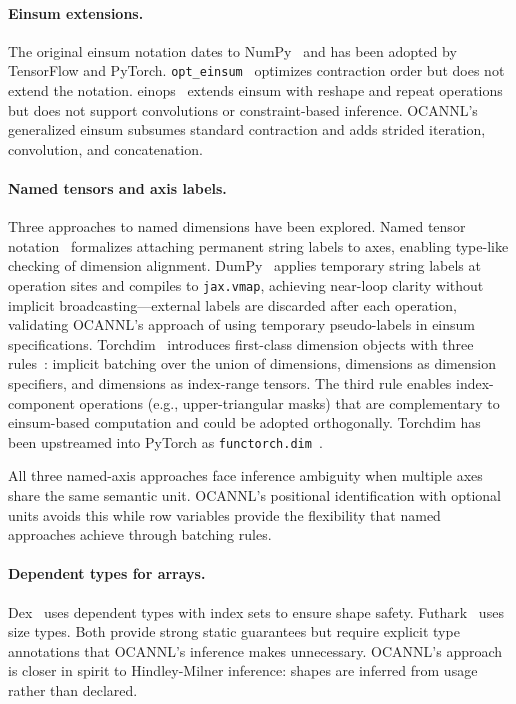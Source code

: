 \documentclass[acmsmall,nonacm,review]{acmart}
\begin{document}
\paragraph{Einsum extensions.}
The original einsum notation dates to NumPy~\cite{harris2020array} and has
been adopted by TensorFlow and PyTorch. \texttt{opt\_einsum}~\cite{smith2018opt}
optimizes contraction order but does not extend the notation.
einops~\cite{rogozhnikov2022einops} extends einsum with reshape and repeat
operations but does not support convolutions or constraint-based inference.
OCANNL's generalized einsum subsumes standard contraction and adds strided
iteration, convolution, and concatenation.

\paragraph{Named tensors and axis labels.}
Three approaches to named dimensions have been explored.
Named tensor notation~\cite{chiang2021named} formalizes attaching
permanent string labels to axes, enabling type-like checking of
dimension alignment.
DumPy~\cite{dynomight2025dumpy} applies temporary string labels at
operation sites and compiles to \texttt{jax.vmap}, achieving
near-loop clarity without implicit broadcasting---external labels
are discarded after each operation, validating OCANNL's approach of
using temporary pseudo-labels in einsum specifications.
Torchdim~\cite{devito2024torchdim} introduces first-class dimension
objects with three rules~\cite{devito2024torchdim}: implicit batching
over the union of dimensions, dimensions as dimension specifiers, and
dimensions as index-range tensors. The third rule enables
index-component operations (e.g., upper-triangular masks) that are
complementary to einsum-based computation and could be adopted
orthogonally. Torchdim has been upstreamed into PyTorch as
\texttt{functorch.dim}~\cite{ansel2024pytorch2}.

All three named-axis approaches face inference ambiguity when
multiple axes share the same semantic unit.
OCANNL's positional identification with optional units avoids this
while row variables provide the flexibility that named approaches
achieve through batching rules.

\paragraph{Dependent types for arrays.}
Dex~\cite{paszke2021getting} uses dependent types with index sets to
ensure shape safety. Futhark~\cite{henriksen2017futhark} uses size types.
Both provide strong static guarantees but require explicit type annotations
that OCANNL's inference makes unnecessary. OCANNL's approach is closer in
spirit to Hindley-Milner inference: shapes are inferred from usage rather
than declared.
\end{document}
